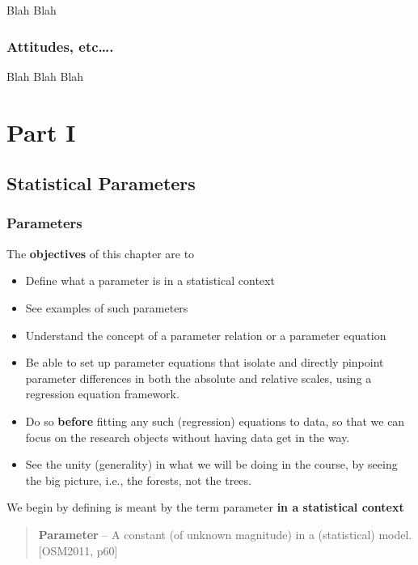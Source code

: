 \documentclass[]{book}
\begin{document}
Blah Blah

\hypertarget{attitudes-etc.}{%
\section{Attitudes, etc\ldots{}.}\label{attitudes-etc.}}

Blah Blah Blah

\hypertarget{part-part-i}{%
\part{Part I}\label{part-part-i}}

\hypertarget{paras}{%
\chapter{Statistical Parameters}\label{paras}}

\hypertarget{parameters}{%
\section{Parameters}\label{parameters}}

The \textbf{objectives} of this chapter are to

\begin{itemize}
\item
  Define what a parameter is in a statistical context
\item
  See examples of such parameters
\item
  Understand the concept of a parameter relation or a parameter equation
\item
  Be able to set up parameter equations that isolate and directly pinpoint parameter differences in both the absolute and relative scales, using a regression equation framework.
\item
  Do so \textbf{before} fitting any such (regression) equations to data, so that we can focus on the research objects without having data get in the way.
\item
  See the unity (generality) in what we will be doing in the course, by seeing the big picture, i.e., the forests, not the trees.
\end{itemize}

We begin by defining is meant by the term parameter \textbf{in a statistical context}

\begin{quote}
\textbf{Parameter} -- A constant (of unknown magnitude) in a (statistical) model. {[}OSM2011, p60{]}
\end{quote}
\end{document}
